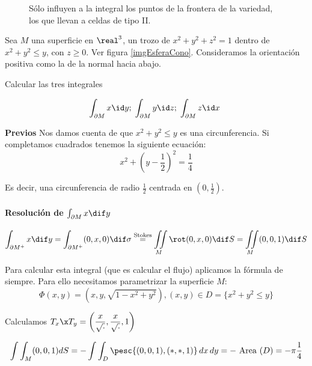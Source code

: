 \begin{figure}[hbtp]
  \begin{center}
    
  \end{center}
  \caption{Sólo influyen a la integral los puntos de la frontera de la variedad, los que llevan a celdas de tipo II.}
  \label{imgStokesCeldasIntegral}
\end{figure}

\begin{example}
Sea $M$ una superficie en $\real^3$, un trozo de $x^2+y^2+z^2 = 1$ dentro de $x^2+y^2\leq y$, con $z\geq 0$. Ver figura \ref{imgEsferaCono}. Consideramos la orientación positiva como la de la normal hacia abajo.



Calcular las tres integrales

\[ \int_{\partial M} x \id y;\;\int_{\partial M} y \id z;\; \int_{\partial M} z \id x \]

\textbf{Previos} Nos damos cuenta de que $x^2+y^2\leq y$ es una circunferencia. Si completamos cuadrados tenemos la siguiente ecuación: \[x^2+\left(y-\frac{1}{2}\right)^2 = \frac{1}{4}\]

Es decir, una circunferencia de radio $\frac{1}{2}$ centrada en $(0,\frac{1}{2})$.

\paragraph{Resolución de $\int_{\partial M} x \dif y$}

\[
\int_{\partial M^{+}} x\dif y =\int_{\partial M^{+}} (0,x,0) \dif\sigma \stackrel{\mathrm{Stokes} }{=} \iint\limits_M \rot (0,x,0) \dif S = \iint\limits_M (0,0,1) \dif S
\]

Para calcular esta integral (que es calcular el flujo) aplicamos la fórmula de siempre. Para ello necesitamos parametrizar la superficie $M$:
\begin{equation}\label{eqEjStokes}
\Phi(x,y) = (x,y,\sqrt{1-x^2+y^2}), (x,y)\in D = \{x^2+y^2\leq y\}
\end{equation}

Calculamos $T_x\x T_y =\displaystyle \left(\frac{x}{\sqrt{\cdot}},\frac{x}{\sqrt{\cdot}},1\right)$

\[
\int \int_M (0,0,1) dS = - \int \int_D \pesc{(0,0,1),(\ast,\ast,1)} \,dx\,dy = -\text{ Area } (D) = -\pi\frac{1}{4}
\]


\end{example}
